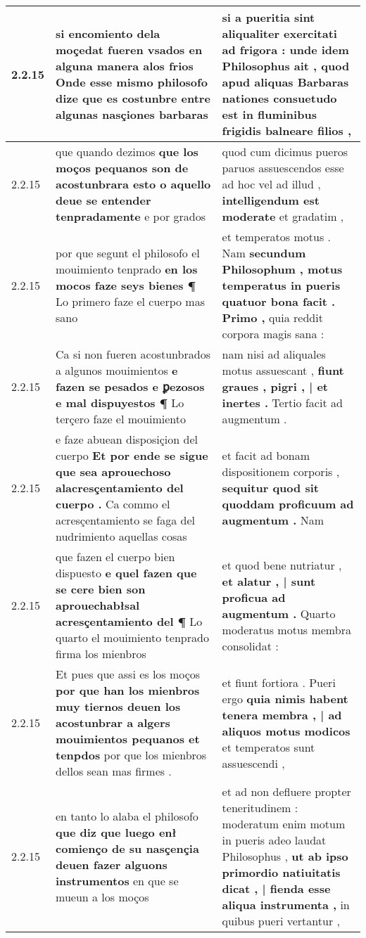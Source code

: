 \begin{tabular}{|p{1cm}|p{6.5cm}|p{6.5cm}|}
2.2.15 & si encomiento dela moçedat fueren vsados en alguna manera alos frios \textbf{ Onde esse mismo philosofo dize } que es costunbre entre algunas nasçiones barbaras & si a pueritia sint aliqualiter exercitati ad frigora : \textbf{ unde idem Philosophus ait , } quod apud aliquas Barbaras nationes consuetudo est in fluminibus frigidis balneare filios , \\\hline
2.2.15 & que quando dezimos \textbf{ que los moços pequanos son de acostunbrara esto o aquello deue se entender tenpradamente } e por grados & quod cum dicimus pueros paruos assuescendos esse ad hoc vel ad illud , \textbf{ intelligendum est moderate } et gradatim , \\\hline
2.2.15 & por que segunt el philosofo el mouimiento tenprado \textbf{ en los mocos faze seys bienes ¶ } Lo primero faze el cuerpo mas sano & et temperatos motus . Nam \textbf{ secundum Philosophum , motus temperatus in pueris quatuor bona facit . Primo , } quia reddit corpora magis sana : \\\hline
2.2.15 & Ca si non fueren acostunbrados a algunos mouimientos \textbf{ e fazen se pesados e ꝑezosos e mal dispuyestos ¶ } Lo terçero faze el mouimiento & nam nisi ad aliquales motus assuescant , \textbf{ fiunt graues , pigri , | et inertes . } Tertio facit ad augmentum . \\\hline
2.2.15 & e faze abuean disposiçion del cuerpo \textbf{ Et por ende se sigue que sea aprouechoso alacresçentamiento del cuerpo . } Ca commo el acresçentamiento se faga del nudrimiento aquellas cosas & et facit ad bonam dispositionem corporis , \textbf{ sequitur quod sit quoddam proficuum ad augmentum . } Nam \\\hline
2.2.15 & que fazen el cuerpo bien dispuesto \textbf{ e quel fazen que se cere bien son aprouechabłsal acresçentamiento del ¶ } Lo quarto el mouimiento tenprado firma los mienbros & et quod bene nutriatur , \textbf{ et alatur , | sunt proficua ad augmentum . } Quarto moderatus motus membra consolidat : \\\hline
2.2.15 & Et pues que assi es los moços \textbf{ por que han los mienbros muy tiernos deuen los acostunbrar a algers mouimientos pequanos et tenpdos } por que los mienbros dellos sean mas firmes . & et fiunt fortiora . Pueri ergo \textbf{ quia nimis habent tenera membra , | ad aliquos motus modicos } et temperatos sunt assuescendi , \\\hline
2.2.15 & en tanto lo alaba el philosofo \textbf{ que diz que luego enł comienço de su nasçençia deuen fazer alguons instrumentos } en que se mueun a los moços & et ad non defluere propter teneritudinem : moderatum enim motum in pueris adeo laudat Philosophus , \textbf{ ut ab ipso primordio natiuitatis dicat , | fienda esse aliqua instrumenta , } in quibus pueri vertantur , \\\hline

\end{tabular}
